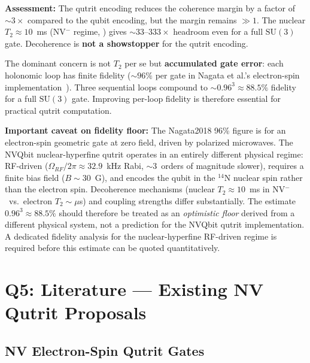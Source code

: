 \documentclass[11pt,letterpaper]{article}
\newcommand{\SU}{\mathrm{SU}}
\begin{document}
\textbf{Assessment:} The qutrit encoding reduces the coherence margin by a factor of
$\sim 3\times$ compared to the qubit encoding, but the margin remains $\gg 1$. The
nuclear $T_2 \approx 10$~ms (NV$^-$ regime, \cite{Pfender2017}) %
gives $\sim 33$--$333\times$ headroom even for a full $\SU(3)$ gate. Decoherence is \textbf{not a showstopper} for the qutrit encoding.

The dominant concern is not $T_2$ per se but \textbf{accumulated gate error}: each
holonomic loop has finite fidelity ($\sim 96\%$ per gate in Nagata et al.'s electron-spin
implementation~\cite{Nagata2018}). %
Three sequential loops compound to $\sim 0.96^3 \approx
88.5\%$ fidelity for a full $\SU(3)$ gate. Improving per-loop fidelity is therefore
essential for practical qutrit computation.

\textbf{Important caveat on fidelity floor:} The Nagata2018 96\% figure is for an
electron-spin geometric gate at zero field, driven by polarized microwaves. The NVQbit
nuclear-hyperfine qutrit operates in an entirely different physical regime: RF-driven
($\Omega_{RF}/2\pi \approx 32.9$~kHz Rabi, $\sim 3$~orders of magnitude slower),
requires a finite bias field ($B \sim 30$~G), and encodes the qubit in the $^{14}$N
nuclear spin rather than the electron spin. Decoherence mechanisms (nuclear $T_2 \approx
10$~ms in NV$^-$ \cite{Pfender2017}%
\ vs.\ electron $T_2 \sim \mu$s) and coupling strengths differ substantially.
The estimate $0.96^3 \approx 88.5\%$ should therefore be treated as an \emph{optimistic
floor} derived from a different physical system, not a prediction for the NVQbit qutrit
implementation. A dedicated fidelity analysis for the nuclear-hyperfine RF-driven regime
is required before this estimate can be quoted quantitatively.


\section{Q5: Literature --- Existing NV Qutrit Proposals}
\label{sec:Q5}

\subsection{NV Electron-Spin Qutrit Gates}
\end{document}
